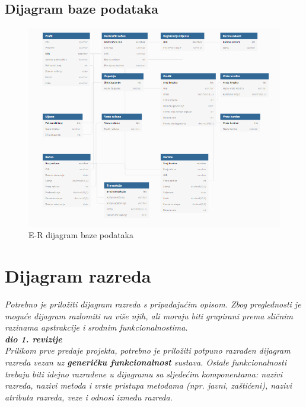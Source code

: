 				
		
		
		
			
			\subsection{Dijagram baze podataka}
				\begin{figure}[H]
					\includegraphics[scale=0.8]{Slike/ermodel.PNG}
					\centering
					\caption{E-R dijagram baze podataka}
					\label{fig:dijagram}
				\end{figure}
			\eject
			
			
		\section{Dijagram razreda}
		
			\textit{Potrebno je priložiti dijagram razreda s pripadajućim opisom. Zbog preglednosti je moguće dijagram razlomiti na više njih, ali moraju biti grupirani prema sličnim razinama apstrakcije i srodnim funkcionalnostima.}\\
			
			\textbf{\textit{dio 1. revizije}}\\
			
			\textit{Prilikom prve predaje projekta, potrebno je priložiti potpuno razrađen dijagram razreda vezan uz \textbf{generičku funkcionalnost} sustava. Ostale funkcionalnosti trebaju biti idejno razrađene u dijagramu sa sljedećim komponentama: nazivi razreda, nazivi metoda i vrste pristupa metodama (npr. javni, zaštićeni), nazivi atributa razreda, veze i odnosi između razreda.}\\
			
